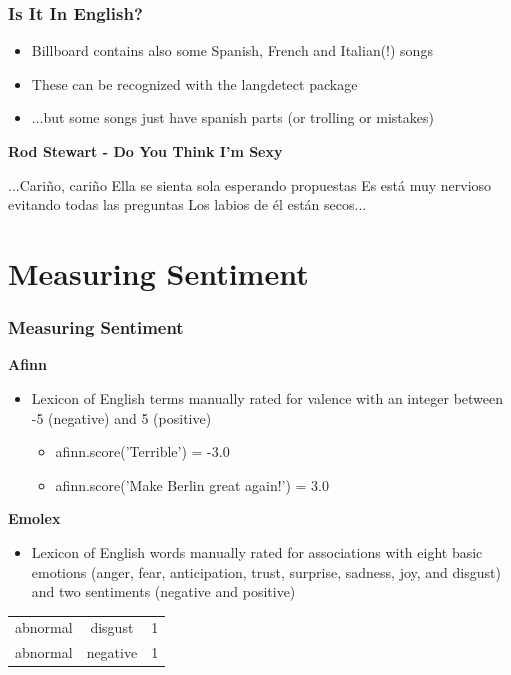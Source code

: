 \documentclass[10pt]{beamer}
\begin{document}
\begin{frame}
\frametitle{Is It In English?}

\medskip

\begin{itemize}
    \item Billboard contains also some Spanish, French and Italian(!) songs
    \item These can be recognized with the langdetect package
    \item ...but some songs just have spanish parts (or trolling or mistakes)
\end{itemize}

\bigskip

\textbf{Rod Stewart - Do You Think I'm Sexy}

...Cariño, cariño  Ella se sienta sola esperando propuestas Es está muy nervioso evitando todas las preguntas Los labios de él están secos...

\end{frame}

\section{Measuring Sentiment}

\begin{frame}
\frametitle{Measuring Sentiment}

\textbf{Afinn}

\begin{itemize}
    \item Lexicon of English terms manually rated for valence with an integer between -5 (negative) and 5 (positive)
    \begin{itemize}
        \item afinn.score('Terrible') = -3.0
        \item afinn.score('Make Berlin great again!') = 3.0
    \end{itemize}
\end{itemize}

\textbf{Emolex}

\begin{itemize}
    \item Lexicon of English words manually rated for associations with eight basic emotions (anger, fear, anticipation, trust, surprise, sadness, joy, and disgust) and two sentiments (negative and positive)
\end{itemize}

\medskip

\begin{tabular}{ l c r }
    abnormal & disgust & 1 \\
    abnormal & negative & 1 \\
\end{tabular}

\end{frame}
\end{document}

